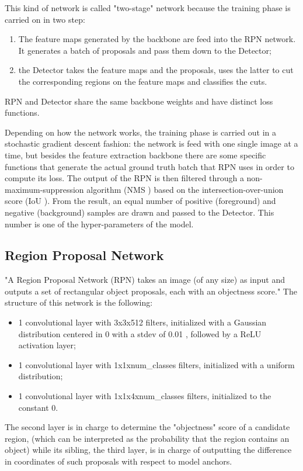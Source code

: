 \documentclass[a4paper,10pt]{report}
\begin{document}
This kind of network is called "two-stage" network because the training phase is carried on in two step:
\begin{enumerate}
    \item The feature maps generated by the backbone are feed into the RPN network. It generates a batch of proposals and pass them down to the Detector;
    \item the Detector takes the feature maps and the proposals, uses the latter to cut the corresponding regions on the feature maps and classifies the cuts.
\end{enumerate}
RPN and Detector share the same backbone weights and have distinct loss functions.

Depending on how the network works, the training phase is carried out in a stochastic gradient descent fashion: the network is feed with one single image at a time, but besides the feature extraction backbone there are some specific functions that generate the actual ground truth batch that RPN uses in order to compute its loss. The output of the RPN is then filtered through a non-maximum-suppression algorithm (NMS \cite{nms}) based on the intersection-over-union score (IoU \cite{iou}). From the result, an equal number of positive (foreground) and negative (background) samples are drawn and passed to the Detector. This number is one of the hyper-parameters of the model.

\subsection{Region Proposal Network}\label{subsec:rpn-net}
"A Region Proposal Network (RPN) takes an image (of any size) as input and outputs a set of rectangular object proposals, each with an objectness score." \cite{faster-rcnn}
The structure of this network is the following:
\begin{itemize}
    \item 1 convolutional layer with 3x3x512 filters, initialized with a Gaussian distribution centered in 0 with a stdev of 0.01  \cite{faster-rcnn}, followed by a ReLU activation layer;
    \item 1 convolutional layer with 1x1xnum\_classes filters, initialized with a uniform distribution;
    \item 1 convolutional layer with 1x1x4xnum\_classes filters, initialized to the constant 0.
\end{itemize}

The second layer is in charge to determine the "objectness" score of a candidate region, (which can be interpreted as the probability that the region contains an object) while its sibling, the third layer, is in charge of outputting the difference in coordinates of such proposals with respect to model anchors.
\end{document}
